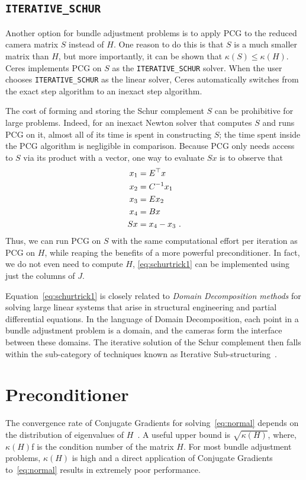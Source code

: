 

\subsection{\texttt{ITERATIVE\_SCHUR}}
Another option for bundle adjustment problems is to apply PCG to the reduced camera matrix $S$ instead of $H$. One reason to do this is that $S$ is a much smaller matrix than $H$, but more importantly, it can be shown that $\kappa(S)\leq \kappa(H)$.  Ceres implements PCG on $S$ as the \texttt{ITERATIVE\_SCHUR} solver. When the user chooses \texttt{ITERATIVE\_SCHUR} as the linear solver, Ceres automatically switches from the exact step algorithm to an inexact step algorithm.

The cost of forming and storing the Schur complement $S$ can be prohibitive for large problems. Indeed, for an inexact Newton solver that computes $S$ and runs PCG on it, almost all of its time is spent in constructing $S$; the time spent inside the PCG algorithm is negligible in comparison. Because  PCG only needs access to $S$ via its product with a vector, one way to evaluate $Sx$ is to observe that
\begin{align}
  x_1 &= E^\top x \notag \\
  x_2 &= C^{-1} x_1 \notag\\
  x_3 &= Ex_2 \notag\\
  x_4 &= Bx \notag\\
  Sx &= x_4 - x_3\ .\label{eq:schurtrick1}
\end{align}
Thus, we can run PCG on $S$ with the same computational effort per iteration as PCG on $H$, while reaping the benefits of a more powerful preconditioner. In fact, we do not even need to compute $H$, \eqref{eq:schurtrick1} can be implemented using just the columns of $J$.

Equation~\eqref{eq:schurtrick1} is closely related to {\em Domain Decomposition methods} for solving large linear systems that arise in structural engineering and partial differential equations. In the language of Domain Decomposition, each point in a bundle adjustment problem is a domain, and the cameras form the interface between these domains. The iterative solution of the Schur complement then falls within the sub-category of techniques known as Iterative Sub-structuring~\cite{saad2003iterative,mathew2008domain}.

\section{Preconditioner}
The convergence rate of Conjugate Gradients  for solving~\eqref{eq:normal} depends on the distribution of eigenvalues of $H$~\cite{saad2003iterative}. A useful upper bound is $\sqrt{\kappa(H)}$, where, $\kappa(H)$f is the condition number of the matrix $H$. For most bundle adjustment problems, $\kappa(H)$ is high and a direct application of Conjugate Gradients to~\eqref{eq:normal} results in extremely poor performance.


